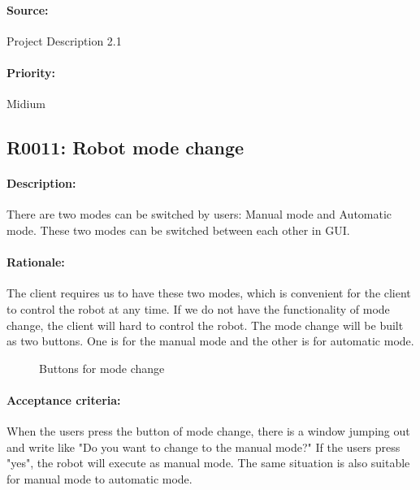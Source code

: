 \documentclass[11pt, a4paper]{report}
\begin{document}
\paragraph{Source:}
 Project Description 2.1
\paragraph{Priority:}
Midium



\subsection{R0011: Robot mode change}
\paragraph{Description:}
There are two modes can be switched by users: Manual mode and Automatic mode. These two modes can be switched between each other in GUI. 
\paragraph{Rationale:}
The client requires us to have these two modes, which is convenient for the client to control the robot at any time. If we do not have the functionality of mode change, the client will hard to control the robot. The mode change will be built as two buttons. One is for the manual mode and the other is for automatic mode.




\begin{figure}[ht]
\centering
\setlength\fboxsep{2pt}
\setlength\fboxrule{0.2pt}
\caption{Buttons for mode change}
\label{sec:NXJCC}
\label{fig:NXJCC}
\end{figure}

\paragraph{Acceptance criteria:}
When the users press the button of mode change, there is a window jumping out and write like "Do you want to change to the manual mode?" If the users press "yes", the robot will execute as manual mode. The same situation is also suitable for manual mode to automatic mode.
\end{document}
